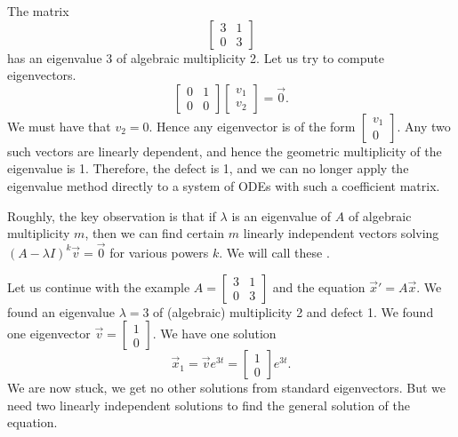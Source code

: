\documentclass{ximera}
\begin{document}
\begin{example}
    The matrix
    \begin{equation*}
        \begin{bmatrix}
            3 & 1 \\ 
            0 & 3
        \end{bmatrix}
    \end{equation*}
    has an eigenvalue 3 of algebraic multiplicity 2. Let us try to compute eigenvectors.
    \begin{equation*}
        \begin{bmatrix}
            0 & 1 \\ 
            0 & 0
        \end{bmatrix}
        \begin{bmatrix}
            v_1 \\ 
            v_2
        \end{bmatrix} 
        = \vec{0} .
    \end{equation*}
    We must have that $v_2 = 0$.  Hence any eigenvector is of the form $\left[ \begin{smallmatrix} v_1 \\ 0 \end{smallmatrix} \right]$.  Any two such vectors are linearly dependent, and hence the geometric multiplicity of the eigenvalue is 1.  Therefore, the defect is 1, and we can no longer apply the eigenvalue method directly to a system of ODEs with such a coefficient matrix.
    
    Roughly, the key observation is that if $\lambda$ is an eigenvalue of $A$ of algebraic multiplicity $m$, then we can find certain $m$ linearly independent vectors solving ${(A-\lambda I)}^k \vec{v} = \vec{0}$ for various powers $k$.  We will call these \emph{}.
    
    
    Let us continue with the example $A = \left[ \begin{smallmatrix} 3 & 1 \\ 0 & 3 \end{smallmatrix} \right]$ and the equation ${\vec{x}}' = A\vec{x}$.
    We found an eigenvalue $\lambda=3$ of (algebraic) multiplicity 2 and defect 1. We found one eigenvector 
    $\vec{v} = \left[ \begin{smallmatrix} 1 \\ 0 \end{smallmatrix} \right]$. We have one solution
    \begin{equation*}
    \vec{x}_1 = \vec{v} e^{3t} = \begin{bmatrix} 1 \\ 0 \end{bmatrix} e^{3t} .
    \end{equation*}
    We are now stuck, we get no other solutions from standard eigenvectors.  But we need two linearly independent solutions to find the general solution of the equation.
    

\end{example}
\end{document}
